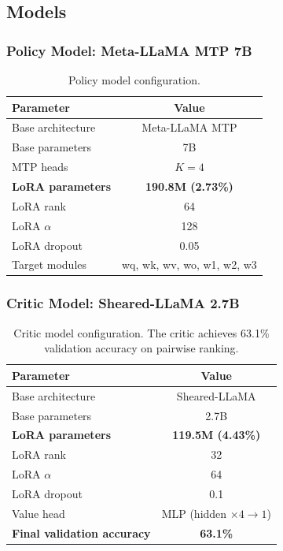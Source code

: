 \subsection{Models}

\subsubsection{Policy Model: Meta-LLaMA MTP 7B}

\begin{table}[h]
\centering
\caption{Policy model configuration.}
\label{tab:policy_model}
\begin{tabular}{lc}
\toprule
\textbf{Parameter} & \textbf{Value} \\
\midrule
Base architecture & Meta-LLaMA MTP \\
Base parameters & 7B \\
MTP heads & $K=4$ \\
\textbf{LoRA parameters} & \textbf{190.8M (2.73\%)} \\
LoRA rank & 64 \\
LoRA $\alpha$ & 128 \\
LoRA dropout & 0.05 \\
Target modules & wq, wk, wv, wo, w1, w2, w3 \\
\bottomrule
\end{tabular}
\end{table}

\subsubsection{Critic Model: Sheared-LLaMA 2.7B}

\begin{table}[h]
\centering
\caption{Critic model configuration. The critic achieves 63.1\% validation accuracy on pairwise ranking.}
\label{tab:critic_model}
\begin{tabular}{lc}
\toprule
\textbf{Parameter} & \textbf{Value} \\
\midrule
Base architecture & Sheared-LLaMA \\
Base parameters & 2.7B \\
\textbf{LoRA parameters} & \textbf{119.5M (4.43\%)} \\
LoRA rank & 32 \\
LoRA $\alpha$ & 64 \\
LoRA dropout & 0.1 \\
Value head & MLP (hidden $\times 4 \rightarrow 1$) \\
\textbf{Final validation accuracy} & \textbf{63.1\%} \\
\bottomrule
\end{tabular}
\end{table}

